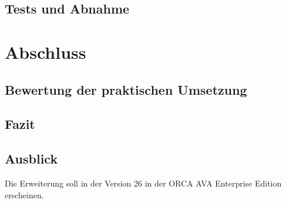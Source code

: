 \section{Tests und Abnahme}
\label{c:qs:tests}


\chapter{Abschluss}
\label{c:closing}
\section{Bewertung der praktischen Umsetzung}
\label{c:closing:rating}
\section{Fazit}
\label{c:closing:conclusion}
\section{Ausblick}
\label{c:closing:outlook}
Die Erweiterung soll in der Version 26 in der ORCA AVA Enterprise Edition erscheinen.
